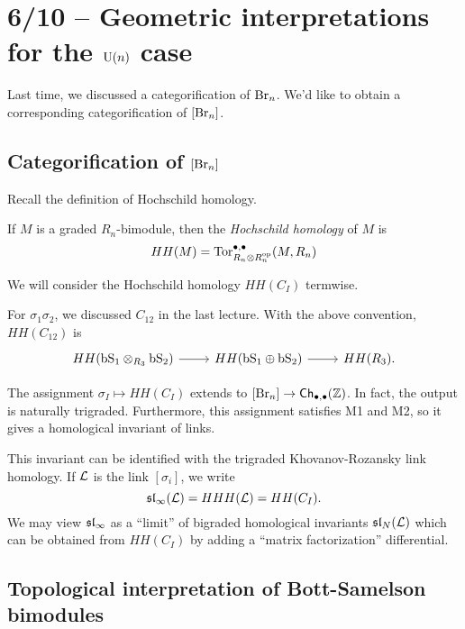 \section{6/10 -- Geometric interpretations for the $\mathrm{U}(n)$ case}

Last time, we discussed a categorification of $\mathrm{Br}_n$.
We'd like to obtain a corresponding categorification of $[\mathrm{Br}_n]$.

\subsection{Categorification of $[\mathrm{Br}_n]$}

Recall the definition of Hochschild homology.

\begin{dfn}
	If $M$ is a graded $R_n$-bimodule, then the \emph{Hochschild homology} of $M$ is
	\[
		HH(M) = \operatorname{Tor}^{\bullet,\bullet}_{R_n \otimes R_n^{\mathrm{op}}}(M, R_n)
	\]
\end{dfn}

We will consider the Hochschild homology $HH(C_I)$ termwise.

\begin{ex}
	For $\sigma_1 \sigma_2$, we discussed $C_{12}$ in the last lecture.
	With the above convention, $HH(C_{12})$ is
	\[
		\begin{tikzcd}
			HH(\bS_1 \otimes_{R_3} \bS_2) \rar & HH(\bS_1 \oplus \bS_2) \rar & HH(R_3).
		\end{tikzcd}
	\]
\end{ex}

\begin{thm}[Khovanov]
	The assignment $\sigma_I \mapsto HH(C_I)$ extends to $[\mathrm{Br}_n] \to \mathsf{Ch}_{\bullet,\bullet}(\mathbb{Z})$.
	In fact, the output is naturally trigraded.
	Furthermore, this assignment satisfies M1 and M2, so it gives a homological invariant of links.
\end{thm}
	
This invariant can be identified with the trigraded Khovanov-Rozansky link homology.
If $\mathcal{L}$ is the link $[\sigma_i]$, we write
\[
	\mathfrak{sl}_\infty(\mathcal{L}) = HHH(\mathcal{L}) = HH(C_I).
\]
We may view $\mathfrak{sl}_\infty$ as a ``limit'' of bigraded homological invariants $\mathfrak{sl}_N(\mathcal{L})$ which can be obtained from $HH(C_I)$ by adding a ``matrix factorization'' differential.

\subsection{Topological interpretation of Bott-Samelson bimodules}

